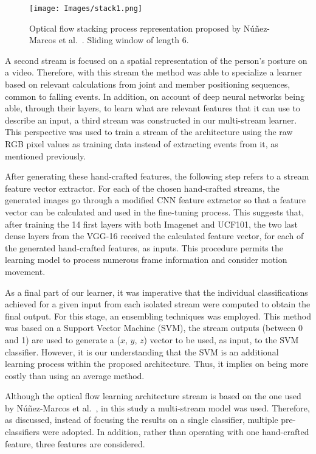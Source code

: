 \documentclass{article}
\begin{document}
\begin{figure}[!htb]
\centering
\texttt{[image: Images/stack1.png]}
\caption{Optical flow stacking process representation proposed by N\'u\~nez-Marcos et al.~\cite{nunez2017vision}. Sliding window of length 6.}
\label{fig:stack}
\end{figure}

A second stream is focused on a spatial representation of the person's posture on a video. Therefore, with this stream the method was able to specialize a learner based on relevant calculations from joint and member positioning sequences, common to falling events. In addition, on account of deep neural networks being able, through their layers, to learn what are relevant features that it can use to describe an input, a third stream was constructed in our multi-stream learner. This perspective was used to train a stream of the architecture using the raw RGB pixel values as training data instead of extracting events from it, as mentioned previously. 

After generating these hand-crafted features, the following step refers to a stream feature vector extractor. For each of the chosen hand-crafted streams, the generated images go through a modified CNN feature extractor so that a feature vector can be calculated and used in the fine-tuning process. This suggests that, after training the 14 first layers with both Imagenet and UCF101, the two last dense layers from the VGG-16 received the calculated feature vector, for each of the generated hand-crafted features, as inputs. This procedure permits the learning model to process numerous frame information and consider motion movement. 

As a final part of our learner, it was imperative that the individual classifications achieved for a given input from each isolated stream were computed to obtain the final output. For this stage, an ensembling techniques was employed. This method was based on a Support Vector Machine (SVM), the stream outputs (between 0 and 1) are used to generate a ($x$, $y$, $z$) vector to be used, as input, to the SVM classifier. However, it is our understanding that the SVM is an additional learning process within the proposed architecture. Thus, it implies on being more costly than using an average method. 
 
Although the optical flow learning architecture stream is based on the one used by N\'u\~nez-Marcos et al.~\cite{nunez2017vision}, in this study a multi-stream model was used. Therefore, as discussed, instead of focusing the results on a single classifier, multiple pre-classifiers were adopted. In addition, rather than operating with one hand-crafted feature, three features are considered.
\end{document}
